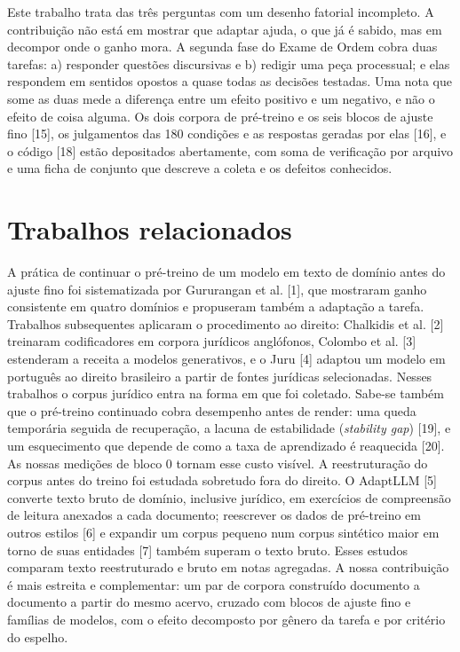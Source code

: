 \documentclass{IOS-Book-Article}
\begin{document}
Este trabalho trata das três perguntas com um desenho fatorial incompleto. A contribuição não está em mostrar que adaptar ajuda, o que já é sabido, mas em decompor onde o ganho mora. A segunda fase do Exame de Ordem cobra duas tarefas: a) responder questões discursivas e b) redigir uma peça processual; e elas respondem em sentidos opostos a quase todas as decisões testadas. Uma nota que some as duas mede a diferença entre um efeito positivo e um negativo, e não o efeito de coisa alguma.
Os dois corpora de pré-treino e os seis blocos de ajuste fino [15], os julgamentos das 180 condições e as respostas geradas por elas [16], e o código [18] estão depositados abertamente, com soma de verificação por arquivo e uma ficha de conjunto que descreve a coleta e os defeitos conhecidos.
\section{Trabalhos relacionados}
A prática de continuar o pré-treino de um modelo em texto de domínio antes do ajuste fino foi sistematizada por Gururangan et al. [1], que mostraram ganho consistente em quatro domínios e propuseram também a adaptação a tarefa. Trabalhos subsequentes aplicaram o procedimento ao direito: Chalkidis et al. [2] treinaram codificadores em corpora jurídicos anglófonos, Colombo et al. [3] estenderam a receita a modelos generativos, e o Juru [4] adaptou um modelo em português ao direito brasileiro a partir de fontes jurídicas selecionadas. Nesses trabalhos o corpus jurídico entra na forma em que foi coletado. Sabe-se também que o pré-treino continuado cobra desempenho antes de render: uma queda temporária seguida de recuperação, a lacuna de estabilidade (\emph{stability gap}) [19], e um esquecimento que depende de como a taxa de aprendizado é reaquecida [20]. As nossas medições de bloco 0 tornam esse custo visível.
A reestruturação do corpus antes do treino foi estudada sobretudo fora do direito. O AdaptLLM [5] converte texto bruto de domínio, inclusive jurídico, em exercícios de compreensão de leitura anexados a cada documento; reescrever os dados de pré-treino em outros estilos [6] e expandir um corpus pequeno num corpus sintético maior em torno de suas entidades [7] também superam o texto bruto. Esses estudos comparam texto reestruturado e bruto em notas agregadas. A nossa contribuição é mais estreita e complementar: um par de corpora construído documento a documento a partir do mesmo acervo, cruzado com blocos de ajuste fino e famílias de modelos, com o efeito decomposto por gênero da tarefa e por critério do espelho.
\end{document}
